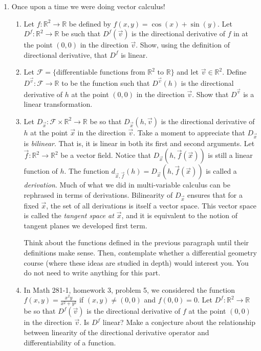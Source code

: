 \documentclass[letter]{article}
\newcommand{\R}{\mathbb{R}}
\begin{document}
\begin{enumerate}
		\item {\sc Once upon a time we were doing vector calculus!}
			\begin{enumerate}
				\item Let $f:\R^2\to \R$ be defined by $f(x,y) = \cos(x)+\sin(y)$.  Let $D^f:\R^2\to\R$
					be such that $D^f(\vec v)$ is the directional derivative of $f$ in at the point $(0,0)$
					in the direction $\vec v$.  Show, using the definition of directional derivative, that
					$D^f$ is linear.
				\item Let $\mathcal F=\{\text{differentiable functions from $\R^2$ to $\R$}\}$ and let $\vec v\in \R^2$.
					Define $D^{\vec v}:\mathcal F\to \R$ to be the function such that $D^{\vec v}(h)$
					is the directional derivative of $h$ at the point $(0,0)$ in the direction $\vec v$.
					Show that $D^{\vec v}$ is a linear transformation.
				\item Let $D_{\vec x}:\mathcal F\times \R^2\to\R$ be so that $D_{\vec x}(h,\vec v)$ is the directional
					derivative of $h$ at the point $\vec x$ in the direction $\vec v$.
					Take a moment to appreciate that $D_{\vec x}$ is \emph{bilinear}.  That is, it is
					linear in both its first and second arguments.  Let $\vec f:\R^2\to\R^2$ be a 
					vector field.  Notice that $D_{\vec x}(h,\vec f(\vec x))$ is still a linear function of
					$h$.  The function $d_{\vec x,\vec f}(h)=D_{\vec x}(h, \vec f(\vec x))$ is called
					a \emph{derivation}.  Much of what we did in multi-variable calculus can be rephrased
					in terms of derivations.    Bilinearity of $D_{\vec x}$
					ensures that for a fixed $\vec x$, the set of all derivations is itself a vector space.
					This vector space is called the \emph{tangent space at $\vec x$}, and it is equivalent
					to the notion of tangent planes we developed first term.

					Think about the functions defined in the previous paragraph until their definitions
					make sense.  Then, contemplate whether a differential geometry course (where these
					ideas are studied in depth) would interest you.  You do not need to write anything for this part.
				\item In Math 281-1, homework 3, problem 5, we considered the function $f(x,y)=\frac{x^2y}{x^2+y^2}$
					if $(x,y)\neq(0,0)$ and $f(0,0)=0$.  Let $D^f:\R^2\to \R$ be so that $D^f(\vec v)$
					is the directional derivative
					of $f$ at the point $(0,0)$ in the direction $\vec v$.  Is $D^f$ linear?  Make a conjecture
					about the relationship between linearity of the directional derivative operator
					and differentiability of a function.
			\end{enumerate}

	\end{enumerate}
\end{document}
